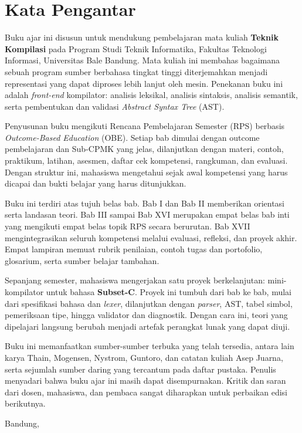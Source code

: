 \chapter*{Kata Pengantar}

Buku ajar ini disusun untuk mendukung pembelajaran mata kuliah
\textbf{Teknik Kompilasi} pada Program Studi Teknik Informatika,
Fakultas Teknologi Informasi, Universitas Bale Bandung. Mata kuliah ini
membahas bagaimana sebuah program sumber berbahasa tingkat tinggi
diterjemahkan menjadi representasi yang dapat diproses lebih lanjut
oleh mesin. Penekanan buku ini adalah \emph{front-end} kompilator:
analisis leksikal, analisis sintaksis, analisis semantik, serta
pembentukan dan validasi \emph{Abstract Syntax Tree} (AST).

Penyusunan buku mengikuti Rencana Pembelajaran Semester (RPS) berbasis
\emph{Outcome-Based Education} (OBE). Setiap bab dimulai dengan outcome
pembelajaran dan Sub-CPMK yang jelas, dilanjutkan dengan materi,
contoh, praktikum, latihan, asesmen, daftar cek kompetensi, rangkuman,
dan evaluasi. Dengan struktur ini, mahasiswa mengetahui sejak awal
kompetensi yang harus dicapai dan bukti belajar yang harus ditunjukkan.

Buku ini terdiri atas tujuh belas bab. Bab I dan Bab II memberikan
orientasi serta landasan teori. Bab III sampai Bab XVI merupakan empat
belas bab inti yang mengikuti empat belas topik RPS secara berurutan.
Bab XVII mengintegrasikan seluruh kompetensi melalui evaluasi,
refleksi, dan proyek akhir. Empat lampiran memuat rubrik penilaian,
contoh tugas dan portofolio, glosarium, serta sumber belajar tambahan.

Sepanjang semester, mahasiswa mengerjakan satu proyek berkelanjutan:
mini-kompilator untuk bahasa \textbf{Subset-C}. Proyek ini tumbuh dari
bab ke bab, mulai dari spesifikasi bahasa dan \emph{lexer}, dilanjutkan
dengan \emph{parser}, AST, tabel simbol, pemeriksaan tipe, hingga
validator dan diagnostik. Dengan cara ini, teori yang dipelajari
langsung berubah menjadi artefak perangkat lunak yang dapat diuji.

Buku ini memanfaatkan sumber-sumber terbuka yang telah tersedia,
antara lain karya Thain, Mogensen, Nystrom, Guntoro, dan catatan kuliah
Asep Juarna, serta sejumlah sumber daring yang tercantum pada daftar
pustaka. Penulis menyadari bahwa buku ajar ini masih dapat
disempurnakan. Kritik dan saran dari dosen, mahasiswa, dan pembaca
sangat diharapkan untuk perbaikan edisi berikutnya.

\begin{flushright}
Bandung, \BookYear\\
\BookAuthor
\end{flushright}
